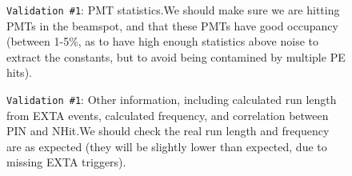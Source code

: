 \documentclass[12pt]{article}
\begin{document}
\begin{figure}
\centering
\noindent{}
  \caption{\centering \texttt{Validation \#1}: PMT statistics.\hspace{\textwidth}We should make sure we are hitting PMTs in the beamspot, and that these PMTs have good occupancy (between 1-5\%, as to have high enough statistics above noise to extract the constants, but to avoid being contamined by multiple PE hits).}
  \label{fig:val4}
\end{figure}

\begin{figure}
\centering
\noindent{}
  \caption{\centering \texttt{Validation \#1}: Other information, including calculated run length from EXTA events, calculated frequency, and correlation between PIN and NHit.\hspace{\textwidth}We should check the real run length and frequency are as expected (they will be slightly lower than expected, due to missing EXTA triggers).}
  \label{fig:val5}
\end{figure}
\end{document}
